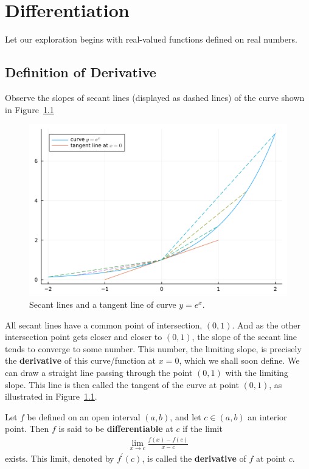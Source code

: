 \documentclass[thmcnt=section, 12pt]{my-elegantbook}
\begin{document}
\chapter{Differentiation}

Let our exploration begins with real-valued functions defined on real numbers.


\section{Definition of Derivative}

Observe the slopes of secant lines (displayed as dashed lines) of the curve shown in Figure~\ref{fig:1}

\begin{figure}[H]
    \centering
    \includegraphics[scale=0.2]{figures/secant-lines-and-a-tangent-line.png}
    \caption{Secant lines and a tangent line of curve $y=e^x$.}
    \label{fig:1}
\end{figure}

\noindent All secant lines have a common point of intersection, $(0, 1)$. And as the other intersection point gets closer and closer to $(0, 1)$, the slope of the secant line tends to converge to some number. This number, the limiting slope, is precisely the \textbf{derivative} of this curve/function at $x=0$, which we shall soon define. We can draw a straight line passing through the point $(0,1)$ with the limiting slope. This line is then called the tangent of the curve at point $(0,1)$, as illustrated in Figure~\ref{fig:1}.

\begin{definition}
    Let $f$ be defined on an open interval $(a, b)$, and let $c \in (a, b)$ an interior point. Then $f$ is said to be \textbf{differentiable} at $c$ if the limit
    \begin{align*}
        \lim_{x \to c} \frac{f(x) - f(c)}{x - c}
    \end{align*}
    exists. This limit, denoted by $f^\prime(c)$, is called the \textbf{derivative}  of $f$ at point $c$.
\end{definition}
\end{document}
